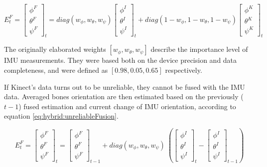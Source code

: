 \documentclass[sensors,article,submit,moreauthors,pdftex,10pt,a4paper]{mdpi}
\begin{document}
\begin{equation} E^F_t = 
	\begin{bmatrix}  \phi^F \\  \theta^F \\  \psi^F \end{bmatrix}_t = 
	diag(w_\phi,w_\theta,w_\psi)
	\begin{bmatrix}  \phi^I \\  \theta^I \\  \psi^I \end{bmatrix}_t + 
	diag(1-w_\phi,1-w_\theta,1-w_\psi)
	\begin{bmatrix}  \phi^K \\  \theta^K \\  \psi^K \end{bmatrix}_t
	\label{eq:hybrid:reliableFusion}
\end{equation}

The originally elaborated weights $[w_\phi , w_\theta , w_\psi]$ describe the importance level of IMU measurements. They were based both on the device precision and data completeness, and were defined as $[0.98, 0.05, 0.65]$ respectively. 

If Kinect’s data turns out to be unreliable, they cannot be fused with the IMU data. Averaged bones orientation are then estimated based on the previously ($t-1$) fused estimation and current change of IMU orientation, according to equation \ref{eq:hybrid:unreliableFusion}.


\begin{equation} 
	\label{eq:hybrid:unreliableFusion}
	E^F_t = 
	\begin{bmatrix}  \phi^F \\  \theta^F \\  \psi^F \end{bmatrix}_t = 
	\begin{bmatrix}  \phi^F \\  \theta^F \\  \psi^F \end{bmatrix}_{t-1} +
	diag(w_\phi,w_\theta,w_\psi)\
	(\begin{bmatrix}  \phi^I \\  \theta^I \\  \psi^I \end{bmatrix}_t -
	\begin{bmatrix}  \phi^I \\  \theta^I \\  \psi^I \end{bmatrix}_{t-1})
\end{equation}
\end{document}
